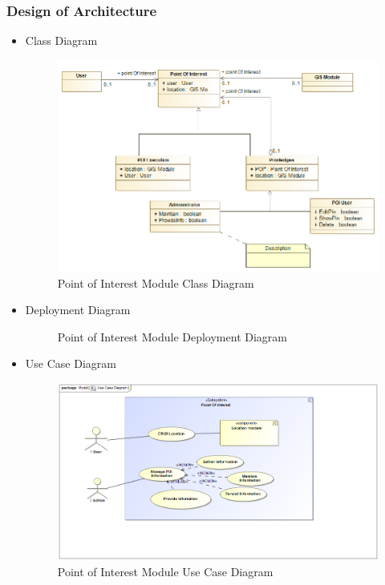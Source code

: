 \documentclass{article}
\begin{document}
		\subsubsection{Design of Architecture}
			\begin{itemize}
 				\item Class Diagram
 				\begin{center}
 					\begin{figure}[!h]
 						\includegraphics[scale=0.6]{POI_ClassDiagram.png}
 						\caption{Point of Interest Module Class Diagram}
 					\end{figure}
 				\end{center}
			
			\item Deployment Diagram
			\begin{center}
				\begin{figure}[!h]
					\caption{Point of Interest Module Deployment Diagram}
				\end{figure}
			\end{center} 
			\pagebreak
			
				\item Use Case Diagram
 				\begin{center}
 					\begin{figure}[!h]
 						\includegraphics[scale=0.5]{Use_Case_Diagram.png}
 						\caption{Point of Interest Module Use Case Diagram}
 					\end{figure}
 				\end{center}
			

\end{itemize}
\end{document}
